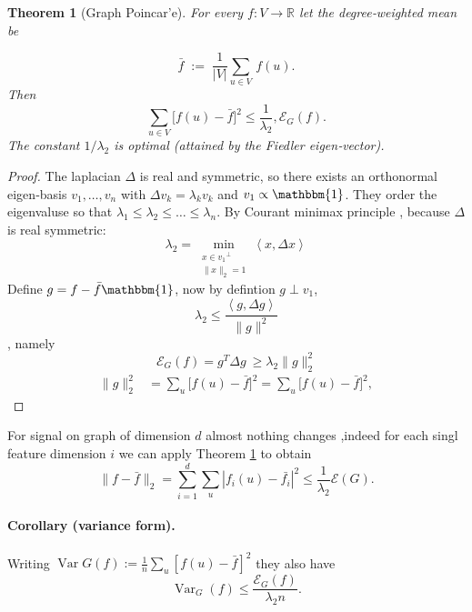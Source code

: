 \documentclass[11pt]{article}\usepackage{amsmath,amssymb,amsthm,bbm}
\newtheorem{theorem}{Theorem}
\newcommand{\EE}{\mathcal{E}}
\newcommand{\RR}{\mathbb{R}}
\newcommand{\1}{\mathbbm{1}}
\newcommand{\ip}[2]{\left\langle #1,#2 \right\rangle}
\newcommand{\laplacian}{\Delta}
\begin{document}
\begin{theorem}[Graph Poincar'e] \label{thm:poincare} For every $f:V\to\RR$ let the degree‑weighted mean be

\[
\bar f \;:=\; \frac{1}{|V|}\sum_{u \in V} \,f(u).\]
Then \begin{equation} \label{eq:poincare} \sum_{u\in V}  \bigl[f(u)-\bar f\bigr]^2  \le \frac{1}{\lambda_2}, \EE_G(f). \end{equation} The constant $1/\lambda_2$ is optimal (attained by the Fiedler eigen‑vector). \end{theorem}
\begin{proof} 
The laplacian $\laplacian$ is real and symmetric, so there exists an orthonormal eigen‑basis ${v_1,\dots,v_n}$ with $\laplacian v_k=\lambda_k v_k$ and $v_1\propto \1$. They order the eigenvaluse so that 
$\lambda_1 \leq \lambda_2 \le \dots \le \lambda_n$. 
By Courant minimax principle \cite{courant1989methods}, 
because $\laplacian$ is real symmetric: 
\[ \lambda_2 = \operatorname{min}_{\substack{x \in {v_1}^{\perp} \\ \|x \|_2 = 1}} \ip{x}{\laplacian x}_{} \]
Define $g=f-\bar {f}{\1}$, now by defintion $g \perp v_1$, 
\[ \lambda_2 \le \frac{\ip{g}{\laplacian g}_{}}{\|g \|^2 } \], namely 
\[ \EE_G(f)  = g^T \laplacian g \ \ge \lambda_2 \| g\|^2_2 \]
\begin{align*} \|g\|_{2}^2 &= \sum_ {u} \bigl[f(u)-\bar f\bigr]^2 = \sum_{u} \bigl[f(u)-\bar f\bigr]^2, \end{align*}\end{proof}

For signal on graph of dimension $d$ almost nothing changes ,indeed for each singl feature dimension $i$ we can apply Theorem \ref{thm:poincare} to obtain 
\[ \|f - \bar{f} \|_2 =  \sum_{i=1}^d \sum_{u} |f_i(u) - \bar{f_i} |^2 \leq \frac{1}{\lambda_2} \EE(G).\]

\paragraph{Corollary (variance form).} Writing $\operatorname{Var}G(f):=\frac1n\sum_{u}[f(u)-\bar f]^2$ they also have \begin{equation} \operatorname{Var}_G(f) \le \frac{\EE_G(f)}{\lambda_2 n}. \end{equation}
\end{document}
